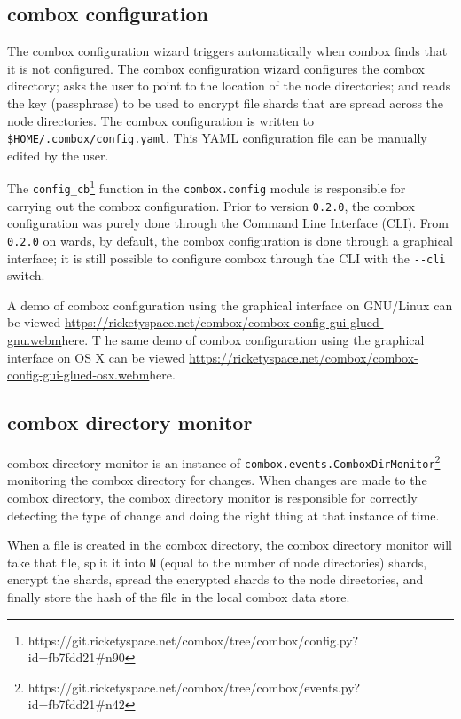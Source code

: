 \subsection{combox configuration}\label{sec:3-combox-config}

The combox configuration wizard triggers automatically when combox
finds that it is not configured. The combox configuration wizard
configures the combox directory; asks the user to point to the location
of the node directories; and reads the key (passphrase) to be used to
encrypt file shards that are spread across the node directories. The
combox configuration is written to
\verb+$HOME/.combox/config.yaml+. This YAML configuration file can be
manually edited by the user.

The
\verb+config_cb+\footnote{https://git.ricketyspace.net/combox/tree/combox/config.py?id=fb7fdd21\#n90}
function in the \verb+combox.config+ module is responsible for
carrying out the combox configuration. Prior to version \verb+0.2.0+,
the combox configuration was purely done through the Command Line Interface (CLI). From
\verb+0.2.0+ on wards, by default, the combox configuration is done
through a graphical interface; it is still possible to configure
combox through the CLI with the \verb+--cli+ switch.

A demo of combox configuration using the graphical interface on
GNU/Linux can be viewed
\url{https://ricketyspace.net/combox/combox-config-gui-glued-gnu.webm}{here}.
T he same demo of combox configuration using the graphical interface on
OS X can be viewed
\url{https://ricketyspace.net/combox/combox-config-gui-glued-osx.webm}{here}.

\subsection{combox directory monitor}\label{sec:3-combox-cdirm}

combox directory monitor is an instance of
\verb+combox.events.ComboxDirMonitor+\footnote{https://git.ricketyspace.net/combox/tree/combox/events.py?id=fb7fdd21\#n42}
monitoring the combox directory for changes. When changes are made to
the combox directory, the combox directory monitor is responsible for
correctly detecting the type of change and doing the right thing at
that instance of time.

When a file is created in the combox directory, the combox directory
monitor will take that file, split it into \verb+N+ (equal to the
number of node directories) shards, encrypt the shards, spread the
encrypted shards to the node directories, and finally store the hash
of the file in the local combox data store.

